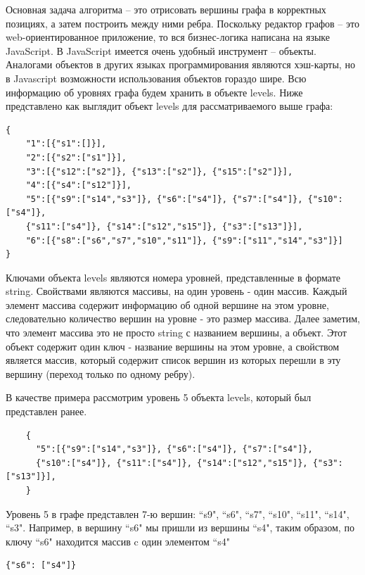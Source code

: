 Основная задача алгоритма -- это отрисовать вершины графа в корректных позициях, а затем построить между ними ребра. Поскольку редактор графов -- это web-ориентированное приложение, то вся бизнес-логика написана на языке \textsf{JavaScript}. В \textsf{JavaScript} имеется очень удобный инструмент -- объекты. Аналогами объектов в других языках программирования являются хэш-карты, но в Javascript возможности использования объектов гораздо шире. Всю информацию об уровнях графа будем хранить в объекте levels. Ниже представлено как выглядит объект levels для рассматриваемого выше графа:

\begin{verbatim}
{
	"1":[{"s1":[]}],
	"2":[{"s2":["s1"]}],
	"3":[{"s12":["s2"]}, {"s13":["s2"]}, {"s15":["s2"]}],
	"4":[{"s4":["s12"]}],
	"5":[{"s9":["s14","s3"]}, {"s6":["s4"]}, {"s7":["s4"]}, {"s10":["s4"]}, 
	{"s11":["s4"]},	{"s14":["s12","s15"]}, {"s3":["s13"]}],
	"6":[{"s8":["s6","s7","s10","s11"]}, {"s9":["s11","s14","s3"]}]
}
\end{verbatim}

Ключами объекта levels являются номера уровней, представленные в формате string. Свойствами являются массивы, на один уровень - один массив. Каждый элемент массива содержит информацию об одной вершине на этом уровне, следовательно количество вершин на уровне - это размер массива. Далее заметим, что элемент массива это не просто string с названием вершины, а объект. Этот объект содержит один ключ - название вершины на этом уровне, а свойством является массив, который содержит список вершин из которых перешли в эту вершину (переход только по одному ребру).

В качестве примера рассмотрим уровень 5 объекта levels, который был представлен ранее.

\begin{minipage}{0.5\textwidth}
	\begin{verbatim}
	{
	  "5":[{"s9":["s14","s3"]}, {"s6":["s4"]}, {"s7":["s4"]}, 
	  {"s10":["s4"]}, {"s11":["s4"]}, {"s14":["s12","s15"]}, {"s3":["s13"]}],
	}
	\end{verbatim}
\end{minipage}


Уровень 5 в графе представлен 7-ю вершин: ``s9", ``s6", ``s7", ``s10", ``s11", ``s14", ``s3". Например, в вершину ``s6" мы пришли из вершины ``s4", таким образом, по ключу ``s6" находится массив c один элементом ``s4"
\begin{verbatim}
{"s6": ["s4"]}
\end{verbatim}

